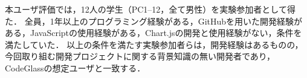





本ユーザ評価では，12人の学生（PC1--12，全て男性）を実験参加者として得た．
全員，1年以上のプログラミング経験がある，GitHubを用いた開発経験がある，JavaScriptの使用経験がある，Chart.jsの開発と使用経験がない，条件を満たしていた．
以上の条件を満たす実験参加者らは，開発経験はあるものの，今回取り組む開発プロジェクトに関する背景知識の無い開発者であり，CodeGlassの想定ユーザと一致する．



